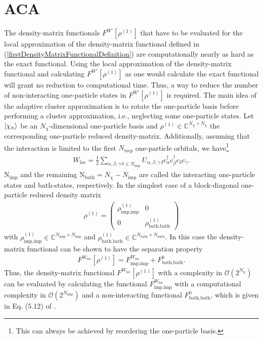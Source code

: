 \documentclass[%
 reprint,
nofootinbib,
 amsmath,amssymb,
 aps,
]{revtex4-2}
\begin{document}
\section{ACA}
The density-matrix functionals $F^{W'}[\rho^{(1)}]$ that have to be evaluated for the local approximation of the density-matrix functional defined in (\ref{firstDensityMatrixFunctionalDefinition}) are computationally nearly as hard as the exact functional. Using the local approximation of the density-matrix functional and calculating $F^{W'}[\rho^{(1)}]$ as one would calculate the exact functional will grant no reduction to computational time. Thus, a way  to reduce the number of non-interacting one-particle states in $F^{W'}[\rho^{(1)}]$ is required. 
The main idea of the adaptive cluster approximation is to rotate the one-particle basis before performing a cluster approximation, i.e., neglecting some one-particle states. 
Let $\ket{\chi_\alpha}$ be an $N_\chi$-dimensional one-particle basis and $\rho^{(1)}\in\mathbb{C}^{N_\chi\times N_\chi}$ the corresponding one-particle reduced density-matrix. Additionally, assuming that the interaction is limited to the first $N_{imp}$ one-particle orbitals, we have\footnote{This can always be achieved by reordering the one-particle basis.}
\begin{eqnarray}
W_\text{loc}=\frac{1}{2}\sum_{\alpha,\beta,\gamma\,\delta\leq N_{\text{imp}}}U_{\alpha,\beta,\gamma\,\delta}c^{\dagger}_\alpha c^{\dagger}_\beta c_\delta c_\gamma.
\end{eqnarray}
N$_\text{imp}$ and the remaining N$_\text{bath}=N_\chi-N_\text{imp}$ are called the interacting one-particle states and bath-states, respectively. 
\break
In the simplest case of a block-diagonal one-particle reduced density matrix 
\begin{eqnarray}
\rho^{(1)}=\begin{pmatrix}
\rho^{(1)}_{\text{imp,imp}} & 0 \\
0 & \rho^{(1)}_{\text{bath,bath}}
\end{pmatrix}
\end{eqnarray}
with $\rho^{(1)}_{\text{imp,imp}}\in\mathbb{C}^{N_{\text{imp}}\times N_{\text{imp}}}$ and $\rho^{(1)}_{\text{bath,bath}}\in\mathbb{C}^{N_{\text{bath}}\times N_{\text{bath}}}$. In this case the density-matrix functional can be shown to have the separation property\cite{schade2019new}
\begin{eqnarray}
F^{W_{\text{loc}}}[\rho^{(1)}] = F^{W_{\text{loc}}}_{\text{imp,imp}}+F^0_{\text{bath,bath}}.\label{separationproperty}
\end{eqnarray}
Thus, the density-matrix functional $F^{W_{\text{loc}}}[\rho^{(1)}]$ with a complexity in $\mathcal{O}(2^{N_\chi})$ can be evaluated by calculating the functional $ F^{W_{\text{loc}}}_{\text{imp,imp}}$ with a computational complexity in $\mathcal{O}(2^{N_{\text{imp}}})$ and a non-interacting functional $F^0_{\text{bath,bath}}$, which is given in Eq. (5.12) of \cite{schade2019new}.
\end{document}
